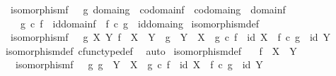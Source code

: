 \begin{isabellebody}
\ \ {\isachardoublequoteopen}isomorphism{\isacharparenleft}{\kern0pt}f{\isacharparenright}{\kern0pt}\ {\isasymlongleftrightarrow}\ {\isacharparenleft}{\kern0pt}{\isasymexists}\ g{\isachardot}{\kern0pt}\ domain{\isacharparenleft}{\kern0pt}g{\isacharparenright}{\kern0pt}\ {\isacharequal}{\kern0pt}\ codomain{\isacharparenleft}{\kern0pt}f{\isacharparenright}{\kern0pt}\ {\isasymand}\ codomain{\isacharparenleft}{\kern0pt}g{\isacharparenright}{\kern0pt}\ {\isacharequal}{\kern0pt}\ domain{\isacharparenleft}{\kern0pt}f{\isacharparenright}{\kern0pt}\ {\isasymand}\ \isanewline
\ \ \ \ {\isacharparenleft}{\kern0pt}g\ {\isasymcirc}\isactrlsub c\ f\ {\isacharequal}{\kern0pt}\ id{\isacharparenleft}{\kern0pt}domain{\isacharparenleft}{\kern0pt}f{\isacharparenright}{\kern0pt}{\isacharparenright}{\kern0pt}{\isacharparenright}{\kern0pt}\ {\isasymand}\ {\isacharparenleft}{\kern0pt}f\ {\isasymcirc}\isactrlsub c\ g\ {\isacharequal}{\kern0pt}\ id{\isacharparenleft}{\kern0pt}domain{\isacharparenleft}{\kern0pt}g{\isacharparenright}{\kern0pt}{\isacharparenright}{\kern0pt}{\isacharparenright}{\kern0pt}{\isacharparenright}{\kern0pt}{\isachardoublequoteclose}\isanewline
\isanewline
{}\isamarkupfalse%
\ isomorphism{\isacharunderscore}{\kern0pt}def{}{\isacharcolon}{\kern0pt}\isanewline
\ \ {\isachardoublequoteopen}isomorphism{\isacharparenleft}{\kern0pt}f{\isacharparenright}{\kern0pt}\ {\isasymlongleftrightarrow}\ {\isacharparenleft}{\kern0pt}{\isasymexists}\ g\ X\ Y{\isachardot}{\kern0pt}\ f\ {\isacharcolon}{\kern0pt}\ X\ {\isasymrightarrow}\ Y\ {\isasymand}\ g\ {\isacharcolon}{\kern0pt}\ Y\ {\isasymrightarrow}\ X\ {\isasymand}\ g\ {\isasymcirc}\isactrlsub c\ f\ {\isacharequal}{\kern0pt}\ id\ X\ {\isasymand}\ f\ {\isasymcirc}\isactrlsub c\ g\ {\isacharequal}{\kern0pt}\ id\ Y{\isacharparenright}{\kern0pt}{\isachardoublequoteclose}\isanewline
%
\isadelimproof
\ \ %
\endisadelimproof
%
\isatagproof
{}\isamarkupfalse%
\ isomorphism{\isacharunderscore}{\kern0pt}def\ cfunc{\isacharunderscore}{\kern0pt}type{\isacharunderscore}{\kern0pt}def\ \isamarkupfalse%
\ auto%
\endisatagproof
{\isafoldproof}%
%
\isadelimproof
\isanewline
%
\endisadelimproof
\isanewline
{}\isamarkupfalse%
\ isomorphism{\isacharunderscore}{\kern0pt}def{}{\isacharcolon}{\kern0pt}\isanewline
\ \ \ {\isachardoublequoteopen}f\ {\isacharcolon}{\kern0pt}\ X\ {\isasymrightarrow}\ Y{\isachardoublequoteclose}\isanewline
\ \ \ {\isachardoublequoteopen}isomorphism{\isacharparenleft}{\kern0pt}f{\isacharparenright}{\kern0pt}\ {\isasymlongleftrightarrow}\ {\isacharparenleft}{\kern0pt}{\isasymexists}\ g{\isachardot}{\kern0pt}\ g\ {\isacharcolon}{\kern0pt}\ Y\ {\isasymrightarrow}\ X\ {\isasymand}\ g\ {\isasymcirc}\isactrlsub c\ f\ {\isacharequal}{\kern0pt}\ id\ X\ {\isasymand}\ f\ {\isasymcirc}\isactrlsub c\ g\ {\isacharequal}{\kern0pt}\ id\ Y{\isacharparenright}{\kern0pt}{\isachardoublequoteclose}\isanewline

\end{isabellebody}
